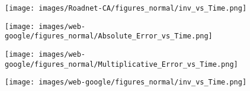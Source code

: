 \begin{figure*}[htbp]
\begin{subfigure}[b]{\textwidth}
\begin{minipage}[b]{0.3\textwidth}
			\texttt{[image: images/Roadnet-CA/figures\_normal/inv\_vs\_Time.png]} %
		\end{minipage}
	\end{subfigure}
	\begin{subfigure}[b]{\textwidth}
		\centering
		\begin{minipage}[b]{0.05\textwidth}
			\centering
		\end{minipage}%
		\begin{minipage}[b]{0.3\textwidth}
			\centering
			\texttt{[image: images/web-google/figures\_normal/Absolute\_Error\_vs\_Time.png]} %
			
		\end{minipage}%
		\begin{minipage}[b]{0.3\textwidth}
			\centering
			
			\texttt{[image: images/web-google/figures\_normal/Multiplicative\_Error\_vs\_Time.png]} %
			
		\end{minipage}%
		\begin{minipage}[b]{0.3\textwidth}
			\centering
			
			\texttt{[image: images/web-google/figures\_normal/inv\_vs\_Time.png]} %
		\end{minipage}
	\end{subfigure}



\end{figure*}

